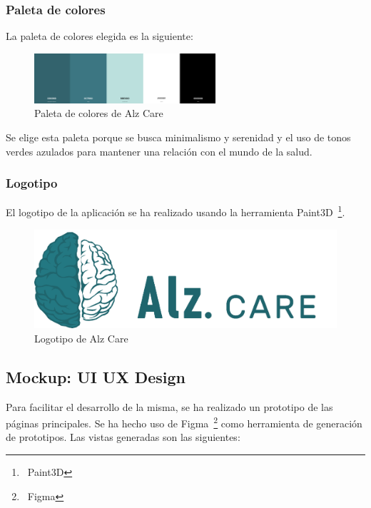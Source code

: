 \subsubsection{Paleta de colores}

La paleta de colores elegida es la siguiente:

\begin{figure}[H]
    \centering
    \includegraphics[width=0.6\textwidth]{./imgs/app/paleta}
    \caption{Paleta de colores de Alz Care}
    \label{fig:paleta-colores}
\end{figure}

Se elige esta paleta porque se busca minimalismo y serenidad y el uso de tonos verdes azulados para mantener una
relación con el mundo de la salud.

\subsubsection{Logotipo}

El logotipo de la aplicación se ha realizado usando la herramienta
Paint3D~\footnote{~\cite{paint-3d}{Paint3D}}.

\begin{figure}[H]
    \centering
    \includegraphics[width=\textwidth]{./imgs/app/icon-name}
    \caption{Logotipo de Alz Care}
    \label{fig:logotipo}
\end{figure}

\subsection{Mockup: UI UX Design}\label{subsec:mockup:-ui-ux-design}
Para facilitar el desarrollo de la misma, se ha realizado un prototipo de las páginas principales.
Se ha hecho uso de Figma~\footnote{~\cite{figma}{Figma}} como herramienta de generación de prototipos.
Las vistas generadas son las siguientes:

